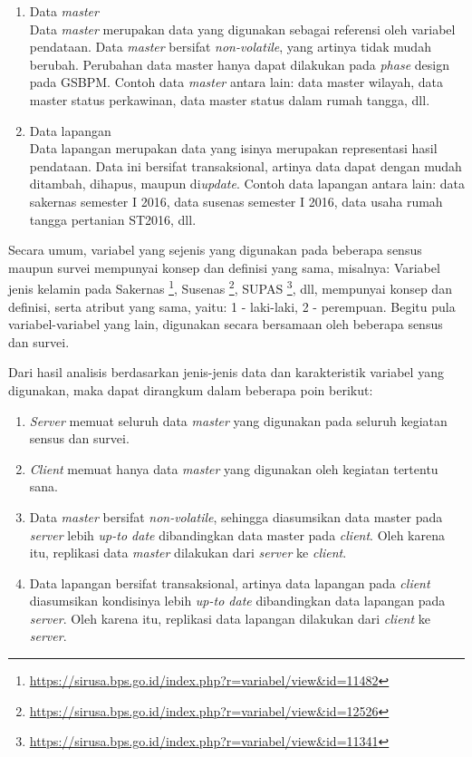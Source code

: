 \begin{enumerate}
\item Data \textit{master} \\
Data \textit{master} merupakan data yang digunakan sebagai referensi oleh variabel pendataan. Data \textit{master} bersifat \textit{non-volatile}, yang artinya tidak mudah berubah. Perubahan data master hanya dapat dilakukan pada \textit{phase} design pada GSBPM. Contoh data \textit{master} antara lain: data master wilayah, data master status perkawinan, data master status dalam rumah tangga, dll.

\item Data lapangan \\
Data lapangan merupakan data yang isinya merupakan representasi hasil pendataan. Data ini bersifat transaksional, artinya data dapat dengan mudah ditambah, dihapus, maupun di\textit{update}. Contoh data lapangan antara lain: data sakernas semester I 2016, data susenas semester I 2016, data usaha rumah tangga pertanian ST2016, dll.
\end{enumerate}


Secara umum, variabel yang sejenis yang digunakan pada beberapa sensus maupun survei mempunyai konsep dan definisi yang sama, misalnya: Variabel jenis kelamin pada Sakernas \footnote{\url{https://sirusa.bps.go.id/index.php?r=variabel/view&id=11482}}, Susenas \footnote{\url{https://sirusa.bps.go.id/index.php?r=variabel/view&id=12526}}, SUPAS \footnote{\url{https://sirusa.bps.go.id/index.php?r=variabel/view&id=11341}}, dll, mempunyai konsep dan definisi, serta atribut yang sama, yaitu: 1 - laki-laki, 2 - perempuan. Begitu pula variabel-variabel yang lain, digunakan secara bersamaan oleh beberapa sensus dan survei.


Dari hasil analisis berdasarkan jenis-jenis data dan karakteristik variabel yang digunakan, maka dapat dirangkum dalam beberapa poin berikut:

\begin{enumerate}
\item \textit{Server} memuat seluruh data \textit{master} yang digunakan pada seluruh kegiatan sensus dan survei.
\item \textit{Client} memuat hanya data \textit{master} yang digunakan oleh kegiatan tertentu sana.
\item Data \textit{master} bersifat \textit{non-volatile}, sehingga diasumsikan data master pada \textit{server} lebih \textit{up-to date} dibandingkan data master pada \textit{client}. Oleh karena itu, replikasi data \textit{master} dilakukan dari \textit{server} ke \textit{client}.
\item Data lapangan bersifat transaksional, artinya data lapangan pada \textit{client} diasumsikan kondisinya lebih \textit{up-to date} dibandingkan data lapangan pada \textit{server}. Oleh karena itu, replikasi data lapangan dilakukan dari \textit{client} ke \textit{server}.
\end{enumerate}


